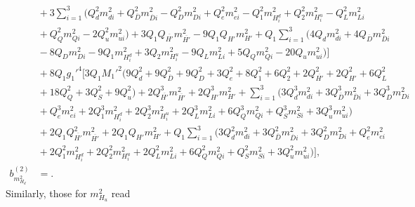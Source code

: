 \documentclass[preprint,amsmath,amssymb,aps,superscriptaddress,prd,showpacs,floatfix,nofootinbib]{revtex4-1}
\begin{document}
\begin{subequations}
\begin{align}
&{}+3\sum_{i=1}^3\big ( Q_d^2m_{di}^2+Q_{\overline{D}}^2m_{\overline{D}i}^2-Q_D^2m_{Di}^2+Q_e^2m_{ei}^2-Q_1^2m_{H_i^d}^2+Q_2^2m_{H_i^u}^2-Q_L^2m_{Li}^2\nonumber\\
&{}+Q_Q^2m_{Qi}^2-2Q_u^2m_{ui}^2\big )+3Q_1Q_{\overline{H'}}m_{\overline{H'}}^2-9Q_1Q_{H'}m_{H'}^2+Q_1\sum_{i=1}^3\bigg ( 4Q_dm_{di}^2+4Q_{\overline{D}}m_{\overline{D}i}^2\nonumber\\
&{}-8Q_Dm_{Di}^2-9Q_1m_{H_i^d}^2+3Q_2m_{H_i^u}^2-9Q_Lm_{Li}^2+5Q_Qm_{Qi}^2-20Q_um_{ui}^2\big )\bigg ]\nonumber\\
&{}+8Q_1g_1'^4\bigg [ 3Q_1M_1'^2\big ( 9Q_d^2+9Q_{\overline{D}}^2+9Q_D^2+3Q_e^2+8Q_1^2+6Q_2^2+2Q_{\overline{H'}}^2+2Q_{H'}^2+6Q_L^2\nonumber\\
&{}+18Q_Q^2+3Q_S^2+9Q_u^2\big )+2Q_{\overline{H'}}^3m_{\overline{H'}}^2+2Q_{H'}^3m_{H'}^2+\sum_{i=1}^3\big ( 3Q_d^3m_{di}^2+3Q_{\overline{D}}^3m_{\overline{D}i}^2+3Q_D^3m_{Di}^2\nonumber\\
&{}+Q_e^3m_{ei}^2+2Q_1^3m_{H_i^d}^2+2Q_2^3m_{H_i^u}^2+2Q_L^3m_{Li}^2+6Q_Q^3m_{Qi}^2+Q_S^3m_{Si}^2+3Q_u^3m_{ui}^2\big )\nonumber\\
&{}+2Q_1Q_{\overline{H'}}^2m_{\overline{H'}}^2+2Q_1Q_{H'}m_{H'}^2+Q_1\sum_{i=1}^3\big ( 3Q_d^2m_{di}^2+3Q_{\overline{D}}^2m_{\overline{D}i}^2+3Q_D^2m_{Di}^2+Q_e^2m_{ei}^2\nonumber\\
&{}+2Q_1^2m_{H_i^d}^2+2Q_2^2m_{H_i^u}^2+2Q_L^2m_{Li}^2+6Q_Q^2m_{Qi}^2+Q_S^2m_{Si}^2+3Q_u^2m_{ui}^2\big )\bigg ],\label{eq:USSMmHd2BetaTwoLoop}\\
b_{m_{H_d}^2}^{(2)}&=.\label{eq:USSMmHd2Ot2Coeff}
\end{align}
\end{subequations}
Similarly, those for $m_{H_u}^2$ read
\end{document}
